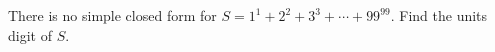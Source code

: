 There is no simple closed form for \(S=1^1+2^2+3^3+\cdots+99^{99}\). Find the units digit of \(S\).
